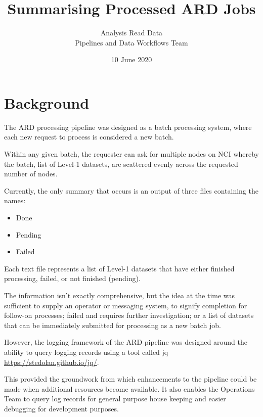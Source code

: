 \documentclass[a4paper,oneside,titlepage]{article}
\title{Summarising Processed ARD Jobs}
\date{10 June 2020}
\author{Analysis Read Data\\ Pipelines and Data Workflows Team}
\begin{document}
  \maketitle
  \newpage

  \tableofcontents

  \newpage

  \section{Background}

    \begin{flushleft}
      The ARD processing pipeline was designed as a batch processing system, where each new request to process is considered a new batch. \par
      Within any given batch, the requester can ask for multiple nodes on NCI whereby the batch, list of Level-1 datasets, are scattered evenly across the requested number of nodes. \par
      Currently, the only summary that occurs is an output of three files containing the names:
    \end{flushleft}

    \begin{itemize}
      \item Done
      \item Pending
      \item Failed
    \end{itemize}

    \begin{flushleft}
      Each text file represents a list of Level-1 datasets that have either finished processing, failed, or not finished (pending). \par
      The information isn't exactly comprehensive, but the idea at the time was sufficient to supply an operator or messaging system, to signify completion for follow-on processes; failed and requires further investigation; or a list of datasets that can be immediately submitted for processing as a new batch job. \par
      However, the logging framework of the ARD pipeline was designed around the ability to query logging records using a tool called jq \url{https://stedolan.github.io/jq/}. \par
      This provided the groundwork from which enhancements to the pipeline could be made when additional resources become available. It also enables the Operations Team to query log records for general purpose house keeping and easier debugging for development purposes.
    \end{flushleft}
\end{document}
